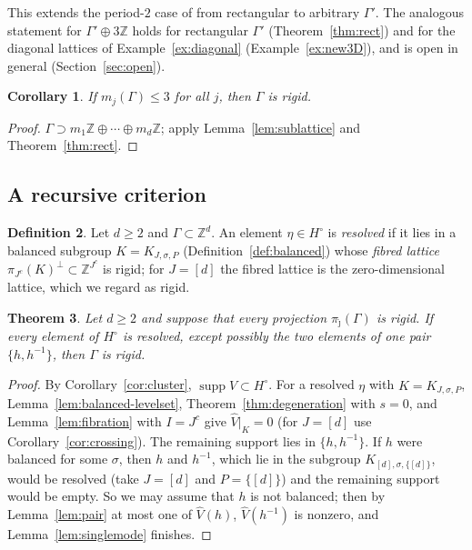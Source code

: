 \documentclass[11pt,reqno]{amsart}
\newtheorem{theorem}{Theorem}[section]
\newtheorem{corollary}[theorem]{Corollary}
\theoremstyle{definition}
\newtheorem{definition}[theorem]{Definition}
\theoremstyle{remark}
\newcommand{\Z}{\mathbb Z}
\DeclareMathOperator{\supp}{supp}
\begin{document}
This extends the period-$2$ case of \cite[Proposition~4.2]{CFK2026} from
rectangular to arbitrary $\Gamma'$.  The analogous statement for
$\Gamma'\oplus3\Z$ holds for rectangular $\Gamma'$ (Theorem~\ref{thm:rect}) and
for the diagonal lattices of Example~\ref{ex:diagonal} (Example~\ref{ex:new3D}),
and is open in general (Section~\ref{sec:open}).

\begin{corollary}\label{cor:directional}
If $m_j(\Gamma)\le3$ for all $j$, then $\Gamma$ is rigid.
\end{corollary}

\begin{proof}
$\Gamma\supset m_1\Z\oplus\cdots\oplus m_d\Z$; apply Lemma~\ref{lem:sublattice} and Theorem~\ref{thm:rect}.
\end{proof}

\subsection{A recursive criterion}

\begin{definition}\label{def:resolvable}
Let $d\ge2$ and $\Gamma\subset\Z^d$.  An element $\eta\in H^\circ$ is
\emph{resolved} if it lies in a balanced subgroup $K=K_{J,\sigma,P}$
(Definition~\ref{def:balanced}) whose \emph{fibred lattice}
$\pi_{J^c}(K)^\perp\subset\Z^{J^c}$ is rigid; for $J=[d]$ the fibred lattice is
the zero-dimensional lattice, which we regard as rigid.
\end{definition}

\begin{theorem}\label{thm:criterion}
Let $d\ge2$ and suppose that every projection $\pi_{\hat\jmath}(\Gamma)$ is
rigid.  If every element of $H^\circ$ is resolved, except possibly the two
elements of one pair $\{h,h^{-1}\}$, then $\Gamma$ is rigid.
\end{theorem}

\begin{proof}
By Corollary~\ref{cor:cluster}, $\supp\widehat V\subset H^\circ$.  For a resolved
$\eta$ with $K=K_{J,\sigma,P}$, Lemma~\ref{lem:balanced-levelset},
Theorem~\ref{thm:degeneration} with $s=0$, and Lemma~\ref{lem:fibration} with
$I=J^c$ give $\widehat V|_K=0$ (for $J=[d]$ use Corollary~\ref{cor:crossing}).
The remaining support lies in $\{h,h^{-1}\}$.  If $h$ were balanced for some
$\sigma$, then $h$ and $h^{-1}$, which lie in the subgroup $K_{[d],\sigma,\{[d]\}}$,
would be resolved (take $J=[d]$ and $P=\{[d]\}$) and the remaining support would
be empty.  So we may assume that $h$ is not balanced; then by
Lemma~\ref{lem:pair} at most one of $\widehat V(h)$, $\widehat V(h^{-1})$ is
nonzero, and Lemma~\ref{lem:singlemode} finishes.
\end{proof}
\end{document}
